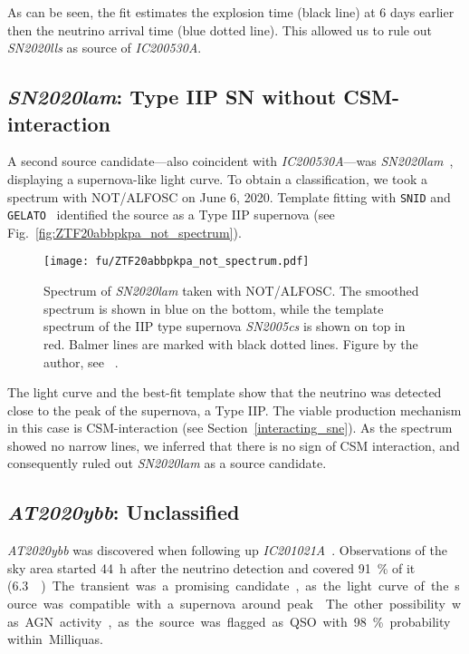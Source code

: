 As can be seen, the fit estimates the explosion time (black line) at 6 days earlier then the neutrino arrival time (blue dotted line). This allowed us to rule out \emph{SN2020lls} as source of \emph{IC200530A}.

\subsection{\emph{SN2020lam}: Type IIP SN without CSM-interaction}\label{SN2020lam}
A second source candidate---also coincident with \emph{IC200530A}---was \emph{SN2020lam}~, displaying a supernova-like light curve. To obtain a classification, we took a spectrum with NOT/ALFOSC on June 6, 2020. Template fitting with \texttt{SNID} and \texttt{GELATO}~ identified the source as a Type IIP supernova (see Fig.~\ref{fig:ZTF20abbpkpa_not_spectrum}).

\begin{figure}[h!]
    \texttt{[image: fu/ZTF20abbpkpa\_not\_spectrum.pdf]}
    \caption[\emph{SN2020lam} spectrum]{Spectrum of \emph{SN2020lam} taken with NOT/ALFOSC. The smoothed spectrum is shown in blue on the bottom, while the template spectrum of the IIP type supernova \emph{SN2005cs} is shown on top in red. Balmer lines are marked with black dotted lines. Figure by the author, see ~\cite{Stein2023a}.}
\end{figure}

The light curve and the best-fit template show that the neutrino was detected close to the peak of the supernova, a Type IIP. The viable production mechanism in this case is CSM-interaction (see Section~\ref{interacting_sne}). As the spectrum showed no narrow lines, we inferred that there is no sign of CSM interaction, and consequently ruled out \emph{SN2020lam} as a source candidate.

\subsection{\emph{AT2020ybb}: Unclassified}
\emph{AT2020ybb} was discovered when following up \emph{IC201021A}~. Observations of the sky area started \SI{44}{\hour} after the neutrino detection and covered \SI{91}{\percent} of it (\SI{6.3}{\square\deg}). The transient was a promising candidate, as the light curve of the source was compatible with a supernova around peak~. The other possibility was AGN activity, as the source was flagged as QSO with \SI{98}{\percent} probability within Milliquas.

